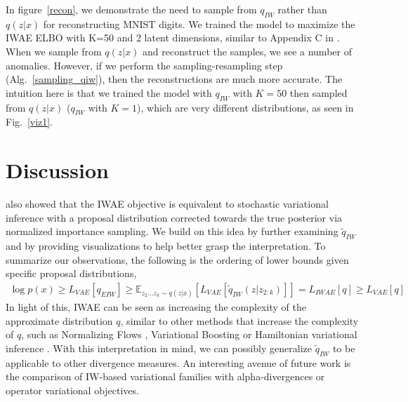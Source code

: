\documentclass{article} %
\begin{document}
In figure~\ref{recon}, we demonstrate the need to sample from $q_{IW}$ rather than $q(z|x)$ for reconstructing MNIST digits.
We trained the model to maximize the IWAE ELBO with K=50 and 2 latent dimensions, similar to Appendix C in \citet{burda2015importance}.
When we sample from $q(z|x)$ and reconstruct the samples, we see a number of anomalies.
However, if we perform the sampling-resampling step (Alg.~\ref{sampling_qiw}), then the reconstructions are much more accurate.
The intuition here is that we trained the model with $q_{IW}$ with $K=50$ then sampled from $q(z|x)$ ($q_{IW}$ with $K=1$), which are very different distributions, as seen in Fig.~\ref{viz1}.



\section{Discussion}
\cite{bachman} also showed that the IWAE objective is equivalent to stochastic variational inference with a proposal distribution corrected towards the true posterior via normalized importance sampling.
We build on this idea by further examining $\tilde{q}_{IW}$ and by providing visualizations to help better grasp the interpretation.
To summarize our observations, the following is the ordering of lower bounds given specific proposal distributions,
\begin{align} 
    \log p(x) \geq L_{VAE}[q_{EIW}] \geq \mathbb{E}_{z_{2} \dots z_{k}\sim q(z|x)} \left[ L_{VAE}[\tilde{q}_{IW}(z|z_{2:k})] \right] = L_{IWAE}[q]  \geq L_{VAE}[q] \nonumber
\end{align}
In light of this, IWAE can be seen as increasing the complexity of the approximate distribution $q$, similar to other methods that increase the complexity of $q$, such as Normalizing Flows \citep{normflow}, Variational Boosting \citep{varboosting} or Hamiltonian variational inference \citep{salimans2015markov}.
With this interpretation in mind, we can possibly generalize $\tilde{q}_{IW}$ to be applicable to other divergence measures.
An interesting avenue of future work is the comparison of IW-based variational families with alpha-divergences or operator variational objectives. 
\end{document}
